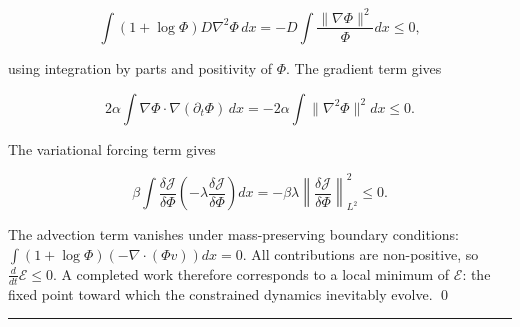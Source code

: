 \documentclass[11pt, twoside]{article}
\theoremstyle{plain}
\theoremstyle{definition}
\theoremstyle{remark}
\begin{document}
\[
\int (1 + \log\Phi) D\nabla^2\Phi \, dx = -D\int \frac{\|\nabla\Phi\|^2}{\Phi} dx \leq 0,
\]

using integration by parts and positivity of $\Phi$. The gradient term gives

\[
2\alpha \int \nabla\Phi \cdot \nabla(\partial_t\Phi) \, dx = -2\alpha \int \|\nabla^2\Phi\|^2 dx \leq 0.
\]

The variational forcing term gives

\[
\beta \int \frac{\delta\mathcal{J}}{\delta\Phi}\left(-\lambda\frac{\delta\mathcal{J}}{\delta\Phi}\right) dx = -\beta\lambda \left\|\frac{\delta\mathcal{J}}{\delta\Phi}\right\|^2_{L^2} \leq 0.
\]

The advection term vanishes under mass-preserving boundary conditions: $\int (1 + \log\Phi)(-\nabla \cdot (\Phi v)) dx = 0$. All contributions are non-positive, so $\frac{d}{dt}\mathcal{E} \leq 0$. A completed work therefore corresponds to a local minimum of $\mathcal{E}$: the fixed point toward which the constrained dynamics inevitably evolve. \qed


\newpage

\noindent\rule{\textwidth}{0.4pt}
\vspace{0.5em}
\end{document}
